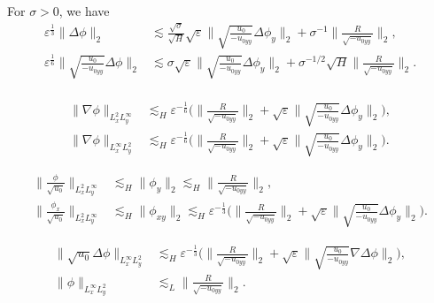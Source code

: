\documentclass[10pt,a4paper]{amsart}
\begin{document}
\begin{corollary}
For $\sigma > 0$, we have
\begin{equation}\label{est:H_weighted_Hardy}
\begin{aligned}
\varepsilon^{\frac{1}{3}}\| \Delta \phi\|_2 & \lesssim \frac{\sqrt\sigma}{\sqrt{H}} \sqrt\varepsilon \| \sqrt{\frac{u_0}{-u_{0yy}}} \Delta \phi_y\|_2 + \sigma^{-1} \|\frac{R}{\sqrt{-u_{0yy}}}\|_2,\\
\varepsilon^{\frac{1}{6}}\| \sqrt{\frac{u_0}{-u_{0yy}}}  \Delta \phi\|_2 & \lesssim \sigma \sqrt\varepsilon \| \sqrt{\frac{u_0}{-u_{0yy}}} \Delta \phi_y\|_2 + \sigma^{-1/2} \sqrt{H}  \|\frac{R}{\sqrt{-u_{0yy}}}\|_2.\\
\end{aligned}
\end{equation}
\end{corollary}

\begin{equation}\label{est:mix_norm_H}
\begin{aligned}
\| \nabla \phi\|_{L^2_x L^\infty_y} &\lesssim_H \varepsilon^{-\frac{1}{6}} \Big( \|\frac{R}{\sqrt{-u_{0yy}}}\|_2 + \sqrt{\varepsilon} \| \sqrt{\frac{u_0}{-u_{0yy}}} \Delta \phi_y\|_2\Big),\\
\| \nabla \phi\|_{L^\infty_x L^2_y} &\lesssim_H \varepsilon^{-\frac{1}{6}}  \Big( \|\frac{R}{\sqrt{-u_{0yy}}}\|_2 + \sqrt{\varepsilon} \| \sqrt{\frac{u_0}{-u_{0yy}}} \Delta \phi_{y}\|_2\Big).
\end{aligned}
\end{equation}

\begin{equation}\label{est:mix_norm_Hardy}
\begin{aligned}
\| \frac{\phi}{\sqrt{u_0}}\|_{L^2_x L^\infty_y} &\lesssim_H \|\phi_y\|_2 \lesssim_H \|\frac{R}{\sqrt{-u_{0yy}}}\|_2,\\
\| \frac{\phi_x}{\sqrt{u_0}}\|_{L^2_x L^\infty_y} &\lesssim_H \|\phi_{xy}\|_2 \lesssim_H \varepsilon^{-\frac{1}{3}} \Big( \|\frac{R}{\sqrt{-u_{0yy}}}\|_2 + \sqrt{\varepsilon} \| \sqrt{\frac{u_0}{-u_{0yy}}} \Delta \phi_{y}\|_2\Big).
\end{aligned}
\end{equation}

\begin{lemma}
\begin{equation}\label{est:mix_norm_misc}
\begin{aligned}
\| \sqrt{u_0} \Delta \phi\|_{L^\infty_x L^2_y} &\lesssim_{H} \varepsilon^{-\frac{1}{3}} \Big( \|\frac{R}{\sqrt{-u_{0yy}}}\|_2 + \sqrt{\varepsilon} \| \sqrt{\frac{u_0}{-u_{0yy}}} \nabla \Delta \phi\|_2\Big),\\
\|\phi\|_{L^\infty_xL^2_y} &\lesssim_{L}  \|\frac{R}{\sqrt{-u_{0yy}}}\|_2.
\end{aligned}
\end{equation}
\end{lemma}
\end{document}
